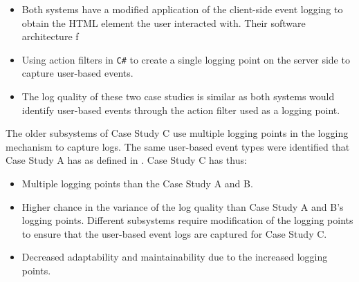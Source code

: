 \begin{itemize}
	\item Both systems have a modified application of the  client-side event logging to obtain the HTML element the user interacted with. Their software architecture f
	\item Using action filters in \texttt{C\#} to create a single logging point on the server side to capture user-based events. 
	\item The log quality of these two case studies is similar as both systems would identify user-based events through the action filter used as a logging point.
\end{itemize}

The older subsystems of Case Study C use multiple logging points in the logging mechanism to capture logs. The same user-based event types were identified that Case Study A has as defined in . Case Study C has thus:

\begin{itemize}
	\item Multiple logging points than the Case Study A and B. 
	\item Higher chance in the variance of the log quality than Case Study A and B's logging points. Different subsystems require modification of the logging points to ensure that the user-based event logs are captured for Case Study C.
	\item Decreased adaptability and maintainability due to the increased logging points.
\end{itemize}

